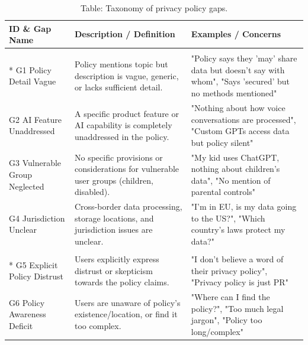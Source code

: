 \begin{table}[htbp]
\centering
\scriptsize
\renewcommand{\arraystretch}{1.3}
\caption*{Table: Taxonomy of privacy policy gaps.}
\label{tab:unified_taxonomy_v3_gaps}
\begin{tabularx}{\textwidth}{@{} p{3.5cm} >{\raggedright\arraybackslash}p{5cm} X @{}}
\toprule
\textbf{ID \& Gap Name} & \textbf{Description / Definition} & \textbf{Examples / Concerns} \\
\midrule

\rowcolor{gray!30} \multicolumn{3}{l}{\textbf{Privacy Policy Gaps -- Policy Coverage Gaps}} \\* \addlinespace[3pt]
G1 Policy Detail Vague & Policy mentions topic but description is vague, generic, or lacks sufficient detail. & \scriptsize "Policy says they 'may' share data but doesn't say with whom", "Says 'secured' but no methods mentioned" \\
G2 AI Feature Unaddressed & A specific product feature or AI capability is completely unaddressed in the policy. & \scriptsize "Nothing about how voice conversations are processed", "Custom GPTs access data but policy silent" \\
G3 Vulnerable Group Neglected & No specific provisions or considerations for vulnerable user groups (children, disabled). & \scriptsize "My kid uses ChatGPT, nothing about children's data", "No mention of parental controls" \\
G4 Jurisdiction Unclear & Cross-border data processing, storage locations, and jurisdiction issues are unclear. & \scriptsize "I'm in EU, is my data going to the US?", "Which country's laws protect my data?" \\
\midrule

\rowcolor{gray!30} \multicolumn{3}{l}{\textbf{Privacy Policy Gaps -- User Perception Gaps}} \\* \addlinespace[3pt]
G5 Explicit Policy Distrust & Users explicitly express distrust or skepticism towards the policy claims. & \scriptsize "I don't believe a word of their privacy policy", "Privacy policy is just PR" \\
G6 Policy Awareness Deficit & Users are unaware of policy's existence/location, or find it too complex. & \scriptsize "Where can I find the policy?", "Too much legal jargon", "Policy too long/complex" \\

\bottomrule
\end{tabularx}
\end{table}